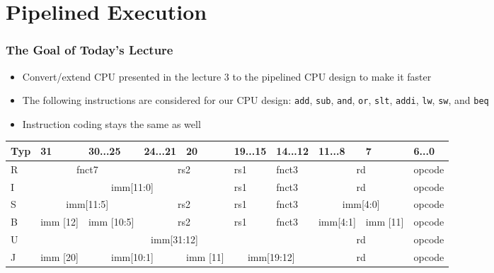 \documentclass{beamer}
\subtitle{Lecture 05. Pipelined Instruction Execution}
\author{Pavel Píša \phantom{xxxxxxx} Petr Štěpán \\ \small\texttt{pisa@fel.cvut.cz} \phantom{x} \small\texttt{stepan@fel.cvut.cz} \\
\phantom{xxxxxxxxx} \\
License: CC-BY-SA}
\begin{document}
\maketitle

\section{Pipelined Execution}

\begin{frame}
\frametitle{The Goal of Today's Lecture}

\begin{itemize}
 \item Convert/extend CPU presented in the lecture 3 to the pipelined CPU design to make it faster
 \item The following instructions are considered for our CPU design: \texttt{add}, \texttt{sub}, \texttt{and}, \texttt{or}, \texttt{slt}, \texttt{addi}, \texttt{lw}, \texttt{sw}, and \texttt{beq}
 \item Instruction coding stays the same as well
\end{itemize}

\begin{table}
\footnotesize
\begin{tabular}{|m{0.4cm}|m{0.4cm}|m{1.0cm}|m{1.0cm}|m{0.4cm}|m{1.0cm}|m{1.0cm}|m{1.0cm}|m{0.4cm}|m{1.0cm}|}\hline
Typ & 31 & 30...25 & 24...21 & 20 & 19...15 & 14...12 & 11...8 & 7 & 6...0 \\ \hline
R & \multicolumn{2}{c|}{ fnct7 } & \multicolumn{2}{c|}{ rs2 } & rs1 & fnct3 &\multicolumn{2}{c|}{ rd } & opcode\\ \hline
I & \multicolumn{4}{c|}{ imm[11:0] } & rs1 & fnct3 &\multicolumn{2}{c|}{ rd } & opcode\\ \hline
S & \multicolumn{2}{c|}{ imm[11:5] } & \multicolumn{2}{c|}{ rs2 } & rs1 & fnct3 &\multicolumn{2}{c|}{ imm[4:0] } & opcode\\ \hline
B & imm [12] & imm [10:5]  & \multicolumn{2}{c|}{ rs2 } & rs1 & fnct3 & imm[4:1]& imm [11] & opcode\\ \hline
U & \multicolumn{6}{c|}{ imm[31:12] }  & \multicolumn{2}{c|}{ rd } & opcode\\ \hline
J & imm [20] & \multicolumn{2}{c|}{ imm[10:1] } & imm [11] & \multicolumn{2}{c|}{ imm[19:12] } & \multicolumn{2}{c|}{ rd } & opcode\\ \hline
\end{tabular}
\end{table}

\end{frame}
\end{document}
